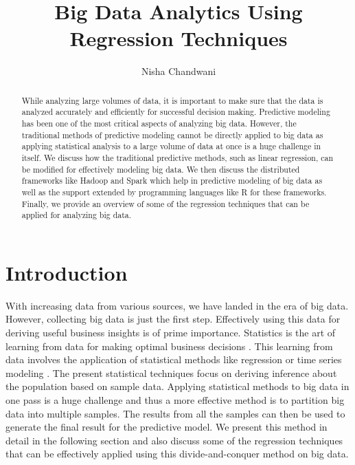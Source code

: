\documentclass[sigconf]{acmart}
\begin{document}
\title{Big Data Analytics Using Regression Techniques}


\author{Nisha Chandwani}

\renewcommand{\shortauthors}{nchandwa}


\begin{abstract}
While analyzing large volumes of data, it is important to make sure that the data is analyzed accurately and efficiently for successful decision making. Predictive modeling has been one of the most critical aspects of analyzing big data. However, the traditional methods of predictive modeling cannot be directly applied to big data as applying statistical analysis to a large volume of data at once is a huge challenge in itself. We discuss how the traditional predictive methods, such as linear regression, can be modified for effectively modeling big data. We then discuss the distributed frameworks like Hadoop and Spark which help in predictive modeling of big data as well as the support extended by programming languages like R for these frameworks. Finally, we provide an overview of some of the regression techniques that can be applied for analyzing big data.
\end{abstract}



\maketitle


\section{Introduction}

With increasing data from various sources, we have landed in the era of big data. However, collecting big data is just the first step. Effectively using this data for deriving useful business insights is of prime importance. Statistics is the art of learning from data for making optimal business decisions \cite{div-reg}. This learning from data involves the application of statistical methods like regression or time series modeling \cite{div-reg}. The present statistical techniques focus on deriving inference about the population based on sample data. Applying statistical methods to big data in one pass is a huge challenge and thus a more effective method is to partition big data into multiple samples. The results from all the samples can then be used to generate the final result for the predictive model. We present this method in detail in the following section and also discuss some of the regression techniques that can be effectively applied using this divide-and-conquer method on big data.
\end{document}
